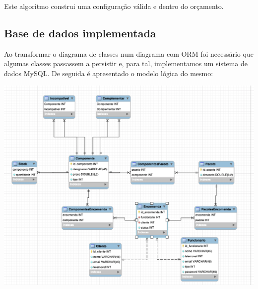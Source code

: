 Este algoritmo construi uma configuração válida e dentro do orçamento.

\newpage
\subsection{Base de dados implementada}
Ao transformar o diagrama de classes num diagrama com ORM foi necessário que algumas classes passassem a persistir e, para tal, implementamos um sistema de dados MySQL. De seguida é apresentado o modelo lógica do mesmo:

\begin{center}
 	\includegraphics[width = 5.5in]{VPP/modelologico.png}
\end{center}
\newpage